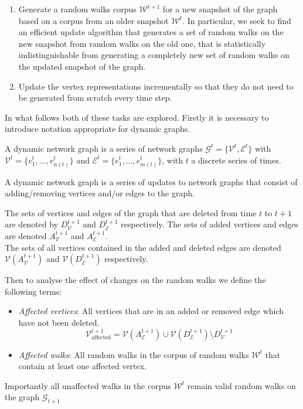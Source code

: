 \documentclass[a4paper]{article}
\renewcommand{\G}{\mathcal G}
\renewcommand{\V}{\mathcal V}
\newcommand{\W}{\mathcal W}
\begin{document}
\begin{enumerate}
\item Generate a random walks corpus $\W^{t+1}$ for a new snapshot of the graph based on
  a corpus from an older snapshot $\W^t$. In particular,
  we seek to find an efficient update algorithm that generates a set of random
  walks on the new snapshot from random walks on the old one, that is
  statistically indistinguishable from generating a completely new set of random walks on the updated snapshot of the graph.
  
\item  Update the vertex representations incrementally so that they do not need
  to be generated from scratch every time step.
  
\end{enumerate}
In what follows both of these tasks are explored. Firstly it is necessary to introduce notation appropriate for dynamic graphs.
\begin{definition}
A dynamic network graph is a series of network graphs $\G^t = \{\V^t,
  \mathcal{E}^t\}$ with $\V^t = \{v_1^t, \dots, v_{n(t)}^t\}$ and $\mathcal{E}^t = \{e_1^t, \dots,
  e_{m(t)}^t\}$, with $t$ a discrete series of times.
\end{definition}
A dynamic network graph is a series of updates to network graphs that consist of
adding/removing vertices and/or edges to the graph.
\begin{definition}
  The sets of vertices and edges of the graph that are deleted from time $t$
  to $t+1$ are denoted by $D_{\V}^{t+1}$ and $D_{\mathcal{E}}^{t+1}$ respectively. The
  sets of added vertices and edges are denoted $A_{\V}^{t+1}$ and
  $A_{\mathcal{E}}^{t+1}$.\\
  The sets of all vertices contained in the added and deleted edges are denoted
  $\V(A_{\V}^{t+1})$ and $\V(D_{\mathcal{E}}^{t+1})$ respectively.
\end{definition}
Then to analyse the effect of changes on the random walks we define the
following terms:
\begin{itemize}
  \item \textit{Affected vertices}: All vertices that are in an added or removed
    edge which have not been deleted.
    \[\V_{\text{affected}}^{t+1} = \V(A_{\mathcal{E}}^{t+1}) \cup
      \V(D_{\mathcal{E}}^{t+1}) \setminus D_{\V}^{t+1}\]
    \item \textit{Affected walks}: All random walks in the corpus of random walks
      $\W^t$ that contain at least one affected vertex.
    \end{itemize}
Importantly all unaffected walks in the corpus $\W^t$ remain valid random walks
on the graph $\G_{t+1}$
\end{document}
